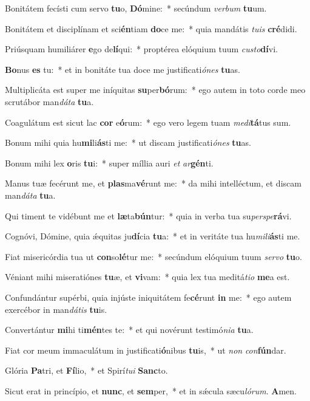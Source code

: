 ﻿\item Bonitátem fecísti cum servo \textbf{tu}o, \textbf{Dó}mine:~* secúndum \emph{ver}\emph{bum} \textbf{tu}um.
\item Bonitátem et disciplínam et sci\textbf{én}tiam \textbf{do}ce me:~* quia mandátis \emph{tu}\emph{is} \textbf{cré}didi.
\item Priúsquam humiliárer \textbf{e}go de\textbf{lí}qui:~* proptérea elóquium tuum \emph{cus}\emph{to}\textbf{dí}vi.
\item \textbf{Bo}nus \textbf{es} tu:~* et in bonitáte tua doce me justificati\emph{ó}\emph{nes} \textbf{tu}as.
\item Multiplicáta est super me iníquitas \textbf{su}per\textbf{bó}rum:~* ego autem in toto corde meo scrutábor man\emph{dá}\emph{ta} \textbf{tu}a.
\item Coagulátum est sicut lac \textbf{cor} e\textbf{ó}rum:~* ego vero legem tuam \emph{me}\emph{di}\textbf{tá}tus sum.
\item Bonum mihi quia hu\textbf{mi}li\textbf{ás}ti me:~* ut discam justificati\emph{ó}\emph{nes} \textbf{tu}as.
\item Bonum mihi lex \textbf{o}ris \textbf{tu}i:~* super míllia auri \emph{et} \emph{ar}\textbf{gén}ti.
\item Manus tuæ fecérunt me, et \textbf{plas}ma\textbf{vé}runt me:~* da mihi intelléctum, et discam man\emph{dá}\emph{ta} \textbf{tu}a.
\item Qui timent te vidébunt me et \textbf{læ}ta\textbf{bún}tur:~* quia in verba tua su\emph{per}\emph{spe}\textbf{rá}vi.
\item Cognóvi, Dómine, quia ǽquitas ju\textbf{dí}cia \textbf{tu}a:~* et in veritáte tua hu\emph{mi}\emph{li}\textbf{ás}ti me.
\item Fiat misericórdia tua ut \textbf{con}so\textbf{lé}tur me:~* secúndum elóquium tuum \emph{ser}\emph{vo} \textbf{tu}o.
\item Véniant mihi miseratiónes \textbf{tu}æ, et \textbf{vi}vam:~* quia lex tua meditá\emph{ti}\emph{o} \textbf{me}a est.
\item Confundántur supérbi, quia injúste iniquitátem fe\textbf{cé}runt \textbf{in} me:~* ego autem exercébor in man\emph{dá}\emph{tis} \textbf{tu}is.
\item Convertántur \textbf{mi}hi ti\textbf{mén}tes te:~* et qui novérunt testimó\emph{ni}\emph{a} \textbf{tu}a.
\item Fiat cor meum immaculátum in justificati\textbf{ó}nibus \textbf{tu}is,~* ut \emph{non} \emph{con}\textbf{fún}dar.
\item Glória \textbf{Pa}tri, et \textbf{Fí}lio,~* et Spirí\emph{tu}\emph{i} \textbf{Sanc}to.
\item Sicut erat in princípio, et \textbf{nunc}, et \textbf{sem}per,~* et in sǽcula sæcu\emph{ló}\emph{rum}. \textbf{A}men.